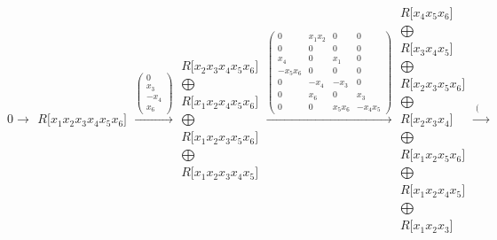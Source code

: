 \documentclass[12pt,a3paper,landscape]{amsart}
\numberwithin{equation}{section}
\theoremstyle{plain}
\theoremstyle{definition}
\begin{document}
$$
0 \rightarrow \begin{matrix}
R \lbrack x_{1}x_{2}x_{3}x_{4}x_{5}x_{6} \rbrack
\end{matrix}
\xrightarrow{\left( \begin{matrix}
0 \\
x_{3} \\
-x_{4} \\
x_{6}
\end{matrix} \right)}\begin{matrix}
R \lbrack x_{2}x_{3}x_{4}x_{5}x_{6} \rbrack \\ \bigoplus \\
R \lbrack x_{1}x_{2}x_{4}x_{5}x_{6} \rbrack \\ \bigoplus \\
R \lbrack x_{1}x_{2}x_{3}x_{5}x_{6} \rbrack \\ \bigoplus \\
R \lbrack x_{1}x_{2}x_{3}x_{4}x_{5} \rbrack
\end{matrix}
\xrightarrow{\left( \begin{matrix}
0 & x_{1}x_{2} & 0 & 0 \\
0 & 0 & 0 & 0 \\
x_{4} & 0 & x_{1} & 0 \\
-x_{5}x_{6} & 0 & 0 & 0 \\
0 & -x_{4} & -x_{3} & 0 \\
0 & x_{6} & 0 & x_{3} \\
0 & 0 & x_{5}x_{6} & -x_{4}x_{5}
\end{matrix} \right)}\begin{matrix}
R \lbrack x_{4}x_{5}x_{6} \rbrack \\ \bigoplus \\
R \lbrack x_{3}x_{4}x_{5} \rbrack \\ \bigoplus \\
R \lbrack x_{2}x_{3}x_{5}x_{6} \rbrack \\ \bigoplus \\
R \lbrack x_{2}x_{3}x_{4} \rbrack \\ \bigoplus \\
R \lbrack x_{1}x_{2}x_{5}x_{6} \rbrack \\ \bigoplus \\
R \lbrack x_{1}x_{2}x_{4}x_{5} \rbrack \\ \bigoplus \\
R \lbrack x_{1}x_{2}x_{3} \rbrack
\end{matrix}
\xrightarrow{\left( \begin{matrix}

\end{matrix}}$$
\end{document}
